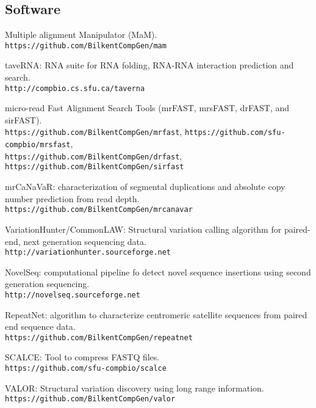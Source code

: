 \clearpage
\vspace*{-.4cm}

\subsection{\small \sc Software}
\begin{list2}
\item
  Multiple alignment Manipulator (MaM).\\
  {\tt https://github.com/BilkentCompGen/mam}
\item
  taveRNA: RNA suite for RNA folding, RNA-RNA interaction prediction and search.\\
  {\tt http://compbio.cs.sfu.ca/taverna}

\item
  micro-read Fast Alignment Search Tools (mrFAST, mrsFAST, drFAST, and sirFAST).\\
  {\tt https://github.com/BilkentCompGen/mrfast},
  {\tt https://github.com/sfu-compbio/mrsfast},\\
  {\tt https://github.com/BilkentCompGen/drfast},
  {\tt https://github.com/BilkentCompGen/sirfast}
\item
  mrCaNaVaR: characterization of segmental duplications and absolute copy number prediction from read depth.\\
  {\tt https://github.com/BilkentCompGen/mrcanavar}
\item
  VariationHunter/CommonLAW: Structural variation calling algorithm for paired-end, next
  generation sequencing data.\\
  {\tt http://variationhunter.sourceforge.net}
\item
  NovelSeq: computational pipeline fo detect novel sequence insertions using second generation sequencing.\\
  {\tt http://novelseq.sourceforge.net}
\item
  RepeatNet: algorithm to characterize centromeric satellite sequences from paired end sequence data.\\
  {\tt https://github.com/BilkentCompGen/repeatnet}
\item
  SCALCE: Tool to compress FASTQ files. \\
  {\tt https://github.com/sfu-compbio/scalce}
\item
  VALOR: Structural variation discovery using long range information.\\
  {\tt https://github.com/BilkentCompGen/valor}
\end{list2}








